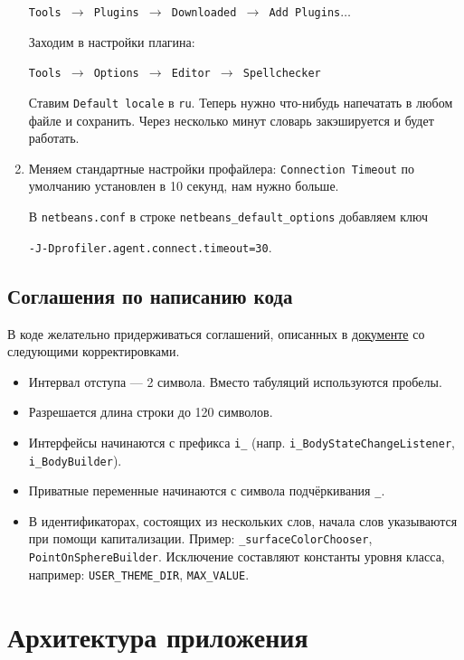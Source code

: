 \documentclass[fontsize=10px, a4paper, openany]{scrbook}
\newcommand{\codeline}[1]{\vspace{5px}\colorbox{light-gray}{\texttt{#1}}\vspace{5px}}
\newcommand{\myarr}{$\rightarrow$ }
\begin{document}
\begin{enumerate}
\codeline{Tools \myarr Plugins \myarr Downloaded \myarr Add Plugins$\ldots$}

Заходим в настройки плагина:

\codeline{Tools \myarr Options \myarr Editor \myarr Spellchecker}

Ставим \texttt{Default locale} в \texttt{ru}. Теперь нужно что-нибудь напечатать в любом файле и сохранить. Через несколько минут словарь закэшируется и будет работать.

\item Меняем стандартные настройки профайлера: \texttt{Connection Timeout} по умолчанию установлен в 10 секунд, нам нужно больше.

В \texttt{netbeans.conf} в строке \texttt{netbeans\_default\_options} добавляем ключ

\codeline{-J-Dprofiler.agent.connect.timeout=30}.
\end{enumerate}

\section*{Соглашения по написанию кода}

В коде желательно придерживаться соглашений, описанных в \href{http://www.oracle.com/technetwork/java/codeconventions-150003.pdf}{документе} со следующими корректировками.

\begin{itemize}
\item Интервал отступа --- 2 символа. Вместо табуляций используются пробелы.
\item Разрешается длина строки до 120 символов.
\item Интерфейсы начинаются с префикса \texttt{i\_} (напр. \texttt{i\_BodyStateChangeListener}, \texttt{i\_BodyBuilder}).
\item Приватные переменные начинаются с символа подчёркивания \texttt{\_}.
\item В идентификаторах, состоящих из нескольких слов, начала слов указываются при помощи капитализации. Пример: \texttt{\_surfaceColorChooser}, \texttt{PointOnSphereBuilder}. Исключение составляют константы уровня класса, например: \texttt{USER\_THEME\_DIR}, \texttt{MAX\_VALUE}.
\end{itemize}

\chapter{Архитектура приложения}
\end{document}
